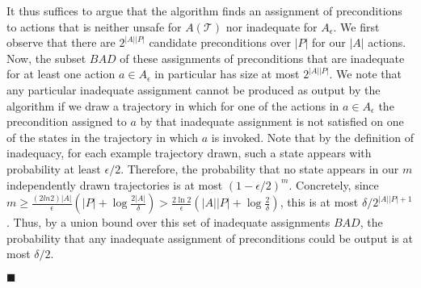 \documentclass[letterpaper]{article}
\newenvironment{proof}{\noindent{\bf Proof:~~}}{\qed}
\newcommand{\qed}{\hfill\ensuremath{\blacksquare}}
\begin{document}
\begin{proof}

It thus suffices to argue that the algorithm finds an assignment of preconditions to actions that is neither unsafe for $A(\mathcal{T})$ nor inadequate for $A_\epsilon$. We first observe that there are $2^{|A||P|}$ candidate preconditions over $|P|$ for our $|A|$ actions. Now, the subset $BAD$ of these assignments of preconditions that are inadequate for at least one action $a\in A_\epsilon$ in particular has size at most $2^{|A||P|}$. We note that any particular inadequate assignment cannot be produced as output by the algorithm if we draw a trajectory in which for one of the actions in $a\in A_\epsilon$ the precondition assigned to $a$ by that inadequate assignment is not satisfied on one of the states in the trajectory in which $a$ is invoked. Note that by the definition of inadequacy, for each example trajectory drawn, such a state appears with probability at least $\epsilon/2$. Therefore, the probability that no state appears in our $m$ independently drawn trajectories is at most $(1-\epsilon/2)^m$. Concretely, since $m\geq\frac{(2ln 2)|A|}{\epsilon}(|P|+\log\frac{2|A|}{\delta})>\frac{2\ln 2}{\epsilon}(|A||P|+\log\frac{2}{\delta})$, this is at most $\delta/2^{|A||P|+1}$. Thus, by a union bound over this set of inadequate assignments $BAD$, the probability that any inadequate assignment of preconditions could be output is at most $\delta/2$.



\end{proof}
\end{document}
